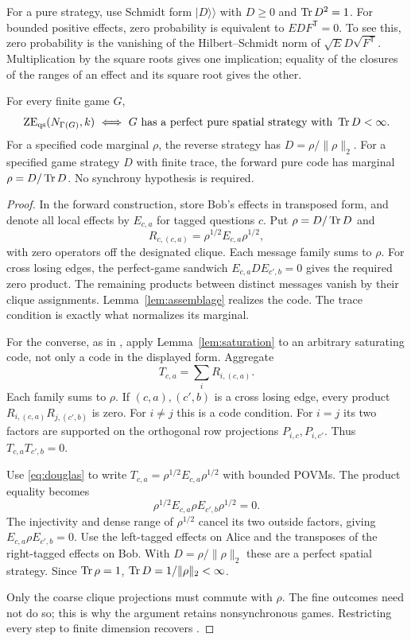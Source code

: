 For a pure strategy, use Schmidt form $|D\rangle\!\rangle$ with $D\geq0$ and $\operatorname{Tr} D^2=1$. For bounded positive effects, zero probability is equivalent to $EDF^{\mathsf T}=0$. To see this, zero probability is the vanishing of the Hilbert--Schmidt norm of $\sqrt E D\sqrt{F^{\mathsf T}}$. Multiplication by the square roots gives one implication; equality of the closures of the ranges of an effect and its square root gives the other.

\begin{theorem}\label{thm:correspondence}
For every finite game $G$,
\[
 \mathrm{ZE}_{\mathrm{qs}}(N_{\Gamma(G)},k)
 \ \Longleftrightarrow\
 G\text{ has a perfect pure spatial strategy with }\operatorname{Tr} D<\infty.
\]
For a specified code marginal $\rho$, the reverse strategy has
$D=\rho/\|\rho\|_2$. For a specified game strategy $D$ with finite trace, the forward pure code has marginal $\rho=D/\operatorname{Tr} D$. No synchrony hypothesis is required.
\end{theorem}
\begin{proof}
In the forward construction, store Bob's effects in transposed form, and denote all local effects by $E_{c,a}$ for tagged questions $c$. Put $\rho=D/\operatorname{Tr} D$ and
\[
 R_{c,(c,a)}=\rho^{1/2}E_{c,a}\rho^{1/2},
\]
with zero operators off the designated clique. Each message family sums to $\rho$. For cross losing edges, the perfect-game sandwich $E_{c,a}DE_{c',b}=0$ gives the required zero product. The remaining products between distinct messages vanish by their clique assignments. Lemma~\ref{lem:assemblage} realizes the code. The trace condition is exactly what normalizes its marginal.

For the converse, as in \cite[Theorem~6]{Mancinska}, apply Lemma~\ref{lem:saturation} to an arbitrary saturating code, not only a code in the displayed form. Aggregate
\[
 T_{c,a}=\sum_iR_{i,(c,a)}.
\]
Each family sums to $\rho$. If $(c,a),(c',b)$ is a cross losing edge, every product $R_{i,(c,a)}R_{j,(c',b)}$ is zero. For $i\ne j$ this is a code condition. For $i=j$ its two factors are supported on the orthogonal row projections $P_{i,c},P_{i,c'}$. Thus $T_{c,a}T_{c',b}=0$.

Use \eqref{eq:douglas} to write $T_{c,a}=\rho^{1/2}E_{c,a}\rho^{1/2}$ with bounded POVMs. The product equality becomes
\[
 \rho^{1/2}E_{c,a}\rho E_{c',b}\rho^{1/2}=0.
\]
The injectivity and dense range of $\rho^{1/2}$ cancel its two outside factors, giving $E_{c,a}\rho E_{c',b}=0$. Use the left-tagged effects on Alice and the transposes of the right-tagged effects on Bob. With $D=\rho/\|\rho\|_2$ these are a perfect spatial strategy. Since $\operatorname{Tr}\rho=1$, $\operatorname{Tr} D=1/\|\rho\|_2<\infty$.

Only the coarse clique projections must commute with $\rho$. The fine outcomes need not do so; this is why the argument retains nonsynchronous games. Restricting every step to finite dimension recovers \cite[Theorem~6]{Mancinska}.
\end{proof}

